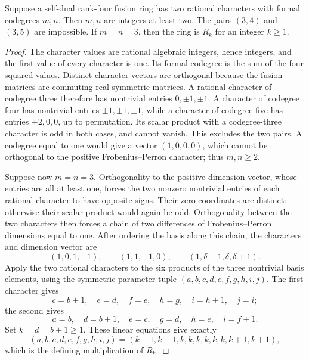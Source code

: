 \begin{lemma}\label{lem:two-rational-codegrees}
Suppose a self-dual rank-four fusion ring has two rational characters with
formal codegrees $m,n$. Then $m,n$ are integers at least two. The pairs
$(3,4)$ and $(3,5)$ are impossible. If $m=n=3$, then the ring is $R_k$ for an integer $k\geq1$.
\end{lemma}
\begin{proof}
The character values are rational algebraic integers, hence integers, and
the first value of every character is one. Its formal codegree is the sum
of the four squared values. Distinct character vectors are orthogonal
because the fusion matrices are commuting real symmetric matrices.
A rational character of codegree three therefore has nontrivial entries
$0,\pm1,\pm1$. A character of codegree four has nontrivial entries
$\pm1,\pm1,\pm1$, while a character of codegree five has entries
$\pm2,0,0$, up to permutation. Its scalar product with a codegree-three
character is odd in both cases, and cannot vanish. This excludes the two
pairs. A codegree equal to one would give a vector $(1,0,0,0)$, which
cannot be orthogonal to the positive Frobenius--Perron character; thus
$m,n\geq2$.

Suppose now $m=n=3$. Orthogonality to the positive dimension vector,
whose entries are all at least one, forces the two nonzero nontrivial
entries of each rational character to have opposite signs. Their zero
coordinates are distinct: otherwise their scalar product would again
be odd. Orthogonality between the two characters then forces a chain of
two differences of Frobenius--Perron dimensions equal to one. After
ordering the basis along this chain, the characters and dimension vector
are
\[
 (1,0,1,-1),\qquad(1,1,-1,0),\qquad
 (1,\delta-1,\delta,\delta+1).
\]
Apply the two rational characters to the six products of the three
nontrivial basis elements, using the symmetric parameter tuple
$(a,b,c,d,e,f,g,h,i,j)$. The first character gives
\[
 c=b+1,\quad e=d,\quad f=e,\quad h=g,\quad i=h+1,\quad j=i;
\]
the second gives
\[
 a=b,\quad d=b+1,\quad e=c,\quad g=d,\quad h=e,\quad i=f+1.
\]
Set $k=d=b+1\geq1$. These linear equations give exactly
\[
 (a,b,c,d,e,f,g,h,i,j)
 =(k-1,k-1,k,k,k,k,k,k,k+1,k+1),
\]
which is the defining multiplication of $R_k$.
\end{proof}

